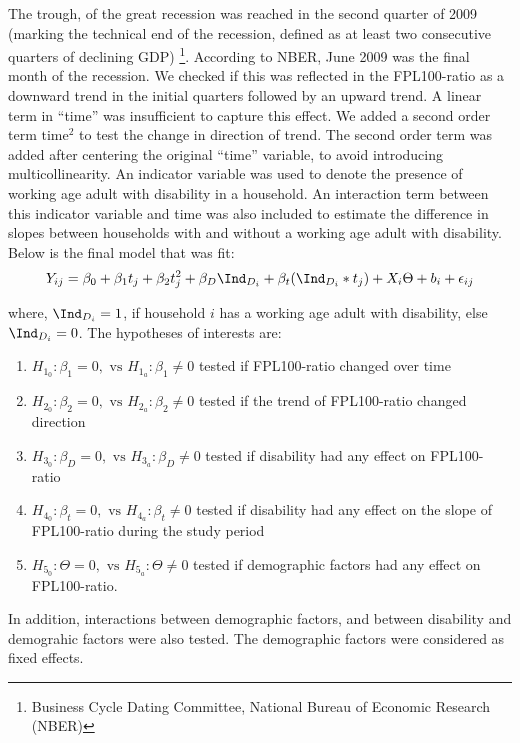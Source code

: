\documentclass[11pt]{extarticle} %
\begin{document}
The  trough, of the great recession was reached in the second quarter of 2009 (marking the technical end of the recession, defined as at least two consecutive quarters of declining GDP) \footnote{Business Cycle Dating Committee, National Bureau of Economic Research (NBER)}. According to NBER, June 2009 was the final month of the recession. We checked if this was reflected in the FPL100-ratio as a downward trend in the initial quarters followed by an upward trend. A linear term in ``time'' was insufficient to capture this effect. We added a second order term $\text{time}^2$ to test the change in direction of trend. The second order term was added after centering the original ``time'' variable, to avoid introducing multicollinearity. An indicator variable was used to denote the presence of working age adult with disability in a household. An interaction term between this indicator variable and time was also included to estimate the difference in slopes between households with and without a working age adult with disability. Below is the final model that was fit: 
\vspace{-0.5cm}
\begin{equation}
Y_{ij} = \beta_0 + \beta_1 t_j + \beta_2 t_j^2 + \beta_D \Ind_{D_i} + \beta_t(\Ind_{D_i}*t_j) + X_i\Theta + b_i + \epsilon_{ij}
\label{eq:MixedEffects2}
\end{equation}

where, $\Ind_{D_i} = 1$, if household $i$ has a working age adult with disability, else $\Ind_{D_i} = 0$. The hypotheses of interests are:
\begin{enumerate}
\item $H_{1_0}: \beta_1 = 0, \text{  vs  } H_{1_a}: \beta_1 \ne 0$ tested if FPL100-ratio changed over time
\item $H_{2_0}: \beta_2 = 0, \text{  vs  } H_{2_a}: \beta_2 \ne 0$ tested if the trend of FPL100-ratio changed direction
\item $H_{3_0}: \beta_D = 0, \text{  vs  } H_{3_a}: \beta_D \ne 0$ tested if disability had any effect on FPL100-ratio
\item $H_{4_0}: \beta_t = 0, \text{  vs  } H_{4_a}: \beta_t \ne 0$ tested if disability had any effect on the slope of FPL100-ratio during the study period
\item $H_{5_0}: \Theta = 0, \text{  vs  } H_{5_a}: \Theta \ne 0$ tested if demographic factors had any effect on FPL100-ratio.
\end{enumerate}
In addition, interactions between demographic factors, and between disability and demograhic factors were also tested. The demographic factors were considered as fixed effects.
\end{document}
